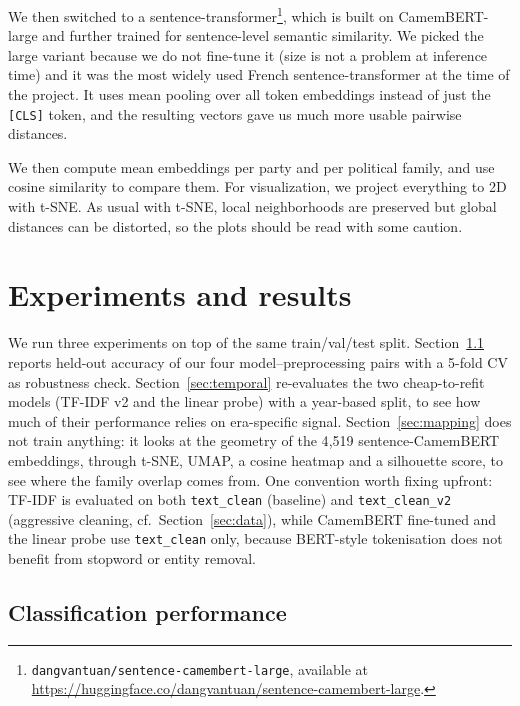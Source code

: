 \documentclass{article}
\begin{document}
We then switched to a sentence-transformer\footnote{\texttt{dangvantuan/sentence-camembert-large}, available at \url{https://huggingface.co/dangvantuan/sentence-camembert-large}.}, which is built on CamemBERT-large and further trained for sentence-level semantic similarity. We picked the large variant because we do not fine-tune it (size is not a problem at inference time) and it was the most widely used French sentence-transformer at the time of the project. It uses mean pooling over all token embeddings instead of just the \texttt{[CLS]} token, and the resulting vectors gave us much more usable pairwise distances.

We then compute mean embeddings per party and per political family, and use cosine similarity to compare them. For visualization, we project everything to 2D with t-SNE. As usual with t-SNE, local neighborhoods are preserved but global distances can be distorted, so the plots should be read with some caution.

\section{Experiments and results}
\label{sec:results}

We run three experiments on top of the same train/val/test split. Section~\ref{sec:results_perf} reports held-out accuracy of our four model--preprocessing pairs with a 5-fold CV as robustness check. Section~\ref{sec:temporal} re-evaluates the two cheap-to-refit models (TF-IDF v2 and the linear probe) with a year-based split, to see how much of their performance relies on era-specific signal. Section~\ref{sec:mapping} does not train anything: it looks at the geometry of the 4{,}519 sentence-CamemBERT embeddings, through t-SNE, UMAP, a cosine heatmap and a silhouette score, to see where the family overlap comes from. One convention worth fixing upfront: TF-IDF is evaluated on both \texttt{text\_clean} (baseline) and \texttt{text\_clean\_v2} (aggressive cleaning, cf.\ Section~\ref{sec:data}), while CamemBERT fine-tuned and the linear probe use \texttt{text\_clean} only, because BERT-style tokenisation does not benefit from stopword or entity removal.

\subsection{Classification performance}
\label{sec:results_perf}
\end{document}
